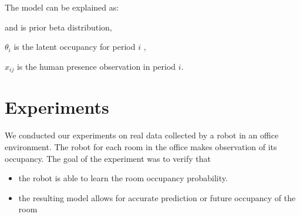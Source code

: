 The model can be explained as:

	\boldmath{$\alpha$} and \boldmath{$\beta$} is  prior beta distribution, 
	
	$\theta_i$ is the latent occupancy for period $i$  ,
	
	$x_{ij}$ is the human presence observation in period $i$.



\FloatBarrier
\section{Experiments}
We conducted our experiments on real data collected by a robot in an office environment. The robot for each room in the office makes observation of its occupancy. The goal of the experiment was to verify that
\begin{itemize}
    \item the robot is able to learn the room occupancy probability.
	\item the resulting model allows for accurate prediction or future occupancy of the room
\end{itemize}



